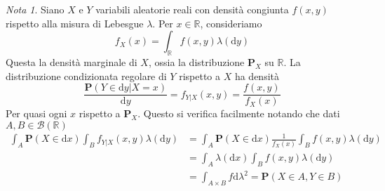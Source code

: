 \documentclass[a4paper,11pt]{book}
\theoremstyle{plain}
\theoremstyle{definition}
\theoremstyle{remark}
\newtheorem*{nota}{Nota}
\newcommand{\R}{\mathbb{R}}
\newcommand{\dx}{\text{d}x}
\newcommand{\dy}{\text{d}y}
\newcommand{\Pro}{\mathbf{P}}
\begin{document}
\begin{nota}
	Siano $X$ e $Y$ variabili aleatorie reali con densità congiunta $f(x,y)$ rispetto alla misura di Lebesgue $\lambda$. Per $x\in \R$, consideriamo
	\begin{equation*}
		f_X(x) = \int_\R{f(x,y)\lambda(\dy)}
	\end{equation*}
	Questa la densità marginale di $X$, ossia la distribuzione $\Pro_X$ su $\R$. La distribuzione condizionata regolare di $Y$ rispetto a $X$ ha densità
	\begin{equation*}
		\frac{\Pro(Y\in \dy|X = x)}{\dy}=f_{Y|X}(x,y)=\frac{f(x,y)}{f_X(x)}
	\end{equation*}
	Per quasi ogni $x$ rispetto a $\Pro_X$. Questo si verifica facilmente notando che dati $A,B\in \mathcal{B(\R)}$
	\begin{equation*}
		\begin{split}
		\int_A{\Pro(X\in \dx)\int_B{f_{Y|X}(x,y)\lambda(\dy)}} & = \int_A{\Pro(X\in \dx)\frac{1}{f_X(x)}\int_{B}{f(x,y)\lambda(\dy)}} \\
		& = \int_A{\lambda(\dx)\int_B{f(x,y)\lambda(\dy)}} \\
		& = \int_{A\times B}{f\text{d}\lambda^2} = \Pro(X\in A, Y\in B)
		\end{split}
	\end{equation*}
\end{nota}
\end{document}
